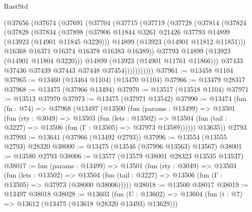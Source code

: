 \begin{lexlean}{RustStd}
\begin{coremodule}
            (@37656
              (@37674
                (@37691
                  (@37704
                    (@37715
                      (@37719
                        (@37728
                          (@37814
                            (@37824
                              (@37828
                                (@37834
                                  (@37898
                                    (@37906
                                      @11844
                                      @3261
                                      @21426
                                      @37793
                                      @14899
                                      (@13923 (@14901 @11845 @3220)))
                                    @14899
                                    (@13923 (@14901 @11812 @11851)))
                                  @16368
                                  @16371
                                  @16374
                                  @16378
                                  @16383
                                  @16389))
                              @37793
                              @14899
                              (@13923 (@14901 @11804 @3220)))
                            @14899
                            (@13923 (@14901 @11761 @11866)))
                          @37433
                          @37436
                          @37439
                          @37443
                          @37448
                          @37454)))))))))))
@37961 := @13458 @1104
@37965 := @13460 (@13464 @1104) (@13470 @1104)
@37966 := @13479 @28317
@37968 := @13475 (@37966 @13494)
@37970 := @13517 (@13518 @1104)
@37971 := @13513 @37970
@37973 := @13475 (@37971 @13542)
@37990 := @13474
    (fun (fn : @74) =>
    @37968
      (@13497
        (@13500
          (fun (params : @13499) =>
          @13501
            (fun (rty : @3049) =>
            @13503
              (fun (lets : @13502) =>
              @13504 (fun (tail : @3227) => @13506 (fun (Γ : @13505) => @37973 @13589))))))
        @13635))
    @2793
@37993 := @13641 (@37966 (@13492 @2793))
@37996 := @13554 (@13555 @2793) @28320
@38000 := @13475 (@13546 (@37996 @13563) @13567)
@38001 := @13580 @2793
@38006 := @13577 (@13579 @38001 @28323 @13535 @13537)
@38017 := fun (params : @13499) =>
  @13501
    (fun (rty : @3049) =>
    @13503
      (fun (lets : @13502) =>
      @13504 (fun (tail : @3227) => @13506 (fun (Γ : @13505) => @37973 (@38000 @38006)))))
@38018 := @13500 @38017
@38019 := @13497 @38018
@38028 := @13603
    (fun (U : @13602) => @13604 (fun (t : @7) => @13612 (@13475 (@13618 @28320 @13493) @13629)))

\end{coremodule}
\end{lexlean}
